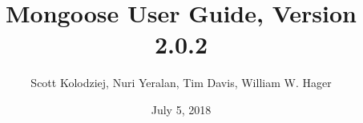 \title{Mongoose User Guide, Version 2.0.2}
\author{Scott Kolodziej, Nuri Yeralan, Tim Davis, William W. Hager}
\date{July 5, 2018}
